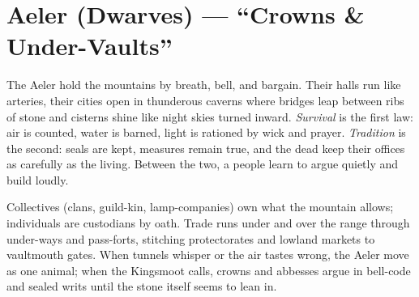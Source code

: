 \section{Aeler (Dwarves) --- ``Crowns \& Under-Vaults''}
\label{chap:aeler}

\begin{tcolorbox}[colback=black!3,colframe=black!40!white,title={Crowns \& Under-Vaults}]
The Aeler hold the mountains by breath, bell, and bargain. Their halls run like arteries, their cities open in thunderous caverns where bridges leap between ribs of stone and cisterns shine like night skies turned inward. \textit{Survival} is the first law: air is counted, water is barned, light is rationed by wick and prayer. \textit{Tradition} is the second: seals are kept, measures remain true, and the dead keep their offices as carefully as the living. Between the two, a people learn to argue quietly and build loudly.

Collectives (clans, guild-kin, lamp-companies) own what the mountain allows; individuals are custodians by oath. Trade runs under and over the range through under-ways and pass-forts, stitching protectorates and lowland markets to vaultmouth gates. When tunnels whisper or the air tastes wrong, the Aeler move as one animal; when the Kingsmoot calls, crowns and abbesses argue in bell-code and sealed writs until the stone itself seems to lean in.
\end{tcolorbox}

